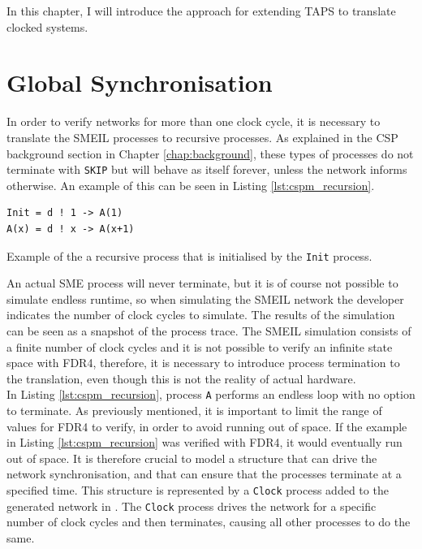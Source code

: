 In this chapter, I will introduce the approach for extending TAPS to translate clocked systems.
\section{Global Synchronisation}
In order to verify networks for more than one clock cycle, it is necessary to translate the SMEIL processes to recursive \cspm{} processes. As explained in the CSP background section in Chapter \ref{chap:background}, these types of processes do not terminate with \texttt{SKIP} but will behave as itself forever, unless the network informs otherwise.
An example of this can be seen in Listing \ref{lst:cspm_recursion}.
\begin{listing}
\begin{verbatim}
Init = d ! 1 -> A(1)
A(x) = d ! x -> A(x+1)
\end{verbatim}
\caption{Example of the a recursive \cspm{} process that is initialised by the \texttt{Init} process.}
\label{lst:cspm_recursion}
\end{listing}

An actual SME process will never terminate, but it is of course not possible to simulate endless runtime, so when simulating the SMEIL network the developer indicates the number of clock cycles to simulate. The results of the simulation can be seen as a snapshot of the process trace. The SMEIL simulation consists of a finite number of clock cycles and it is not possible to verify an infinite state space with FDR4, therefore, it is necessary to introduce process termination to the translation, even though this is not the reality of actual hardware. \\

In Listing \ref{lst:cspm_recursion}, process \texttt{A} performs an endless loop with no option to terminate. As previously mentioned, it is important to limit the range of values for FDR4 to verify, in order to avoid running out of space. If the example in Listing \ref{lst:cspm_recursion} was verified with FDR4, it would eventually run out of space. It is therefore crucial to model a structure that can drive the network synchronisation, and that can ensure that the processes terminate at a specified time. This structure is represented by a \texttt{Clock} process added to the generated network in \cspm{}. The \texttt{Clock} process drives the network for a specific number of clock cycles and then terminates, causing all other processes to do the same. \\

